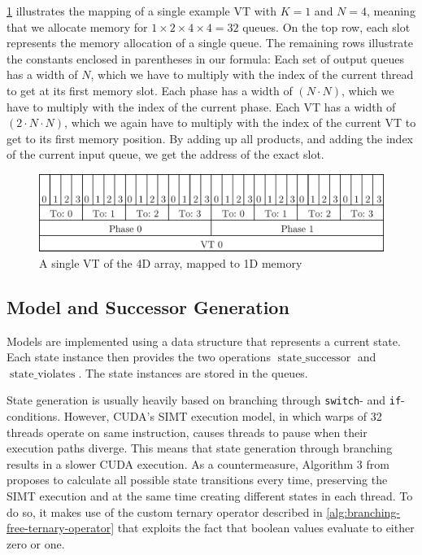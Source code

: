 \documentclass[
fancyheadings, %
%
%
]{stsreprt}
\DeclareMathOperator{\sSuccessor}{state\_successor}
\DeclareMathOperator{\sViolates}{state\_violates}
\begin{document}
\cref{fig:4d-mapped-memory} illustrates the mapping of a single example VT with $K=1$ and $N=4$, meaning that we allocate memory for $1 \times 2 \times 4 \times 4 = 32$ queues.
On the top row, each slot represents the memory allocation of a single queue.
The remaining rows illustrate the constants enclosed in parentheses in our formula:
Each set of output queues has a width of $N$, which we have to multiply with the index of the current thread to get at its first memory slot.
Each phase has a width of $(N \cdot N)$, which we have to multiply with the index of the current phase.
Each VT has a width of $(2 \cdot N \cdot N)$, which we again have to multiply with the index of the current VT to get to its first memory position.
By adding up all products, and adding the index of the current input queue, we get the address of the exact slot.

\begin{figure}[h]
    \includegraphics[width=\textwidth]{figures/4d-mapped-memory}
    \caption{A single VT of the 4D array, mapped to 1D memory}
    \label{fig:4d-mapped-memory}
\end{figure}

\subsection{Model and Successor Generation}

Models are implemented using a data structure that represents a current state.
Each state instance then provides the two operations $\sSuccessor$ and $\sViolates$.
The state instances are stored in the queues.

State generation is usually heavily based on branching through \texttt{switch}- and \texttt{if}-conditions.
However, CUDA's SIMT execution model, in which warps of 32 threads operate on same instruction, causes threads to pause when their execution paths diverge.
This means that state generation through branching results in a slower CUDA execution.
As a countermeasure, Algorithm 3 from \cite{Bartocci2014.GPGPU-Parallel-SPIN} proposes to calculate all possible state transitions every time, preserving the SIMT execution and at the same time creating different states in each thread.
To do so, it makes use of the custom ternary operator described in \cref{alg:branching-free-ternary-operator} that exploits the fact that boolean values evaluate to either zero or one.
\end{document}
